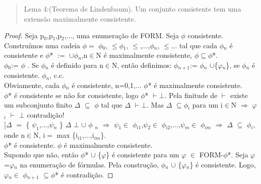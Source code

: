 \documentclass[12pt]{report}
\begin{document}
\begin{quote}
Lema 4:(Teorema de Lindenbaum). Um conjunto consistente tem uma extensão maximalmente consistente.
\end{quote}

\begin{proof}
Seja p$_{0}$,p$_{1}$,p$_{2}$,..., uma enumeração de FORM. Seja $\phi$ consistente. 
Construímos  uma cadeia $\phi$$=$ $\phi$$_{0}$, $\leq$$\phi$$_{1}$, $\leq$,...,$\phi$$_{n}$,
 $\leq$... tal que cada $\phi$$_{n}$ é consistente e $\phi$* $:=$ $\cup$$\phi$$_{n}$,n$\in$N 
 é maximalmente consistente, $\phi$$\subseteq$$\phi$*.\\
$\phi$$_{0}$:= $\phi$ . Se $\phi$$_{n}$ é definido para n$\in$N, então definimos: $\phi$$_{n+1}$:= $\phi$$_{n}$
 $\cup$\{$\varphi$$_{n}$\}, se $\phi$$_{n}$ é consistente. $\phi$$_{n}$, c.c.\\
Obviamente, cada $\phi$$_{n}$ é consistente, n=0,1,... $\phi$* é maximalmente consistente.\\
$\phi$* é consistente se não for consistente, logo $\phi$* $\vdash$$\bot$. Pela finitude de $\vdash$ existe 
um subconjunto finito $\Delta$ $\subseteq$ $\phi$ tal que $\Delta$ $\vdash$$\bot$. Mas $\Delta$ $\subseteq$$\phi$$_{i}$ 
para um i$\in$N $\Longrightarrow$ $\varphi$$_{i}$ $\vdash$ $\bot$ contradição!\\
$[$$\Delta$ $=$ \{ $\psi_{1}$,...,$\psi$$_{n}$ \} $\Delta$ $\bot$ $\cup$ $\phi$ $_{n}$ $\Longrightarrow$ $\psi$$_{1}$$\in$ 
$\phi$$_{i1}$,$\psi$$_{2}$$\in$ $\phi$$_{i2}$,...,$\psi$$_{m}$$\in$ $\phi$$_{im}$ $\Longrightarrow$ $\Delta$ $\subseteq$ 
$\phi$$_{i}$, onde n$\in$N, i$=$ max \{i$_{i1}$,...,i$_{im}$\}.\\
$\phi$* é consistente. $\phi$ é maximalmente consistente.\\
Supondo que não, então $\phi$* $\cup$ \{$\varphi$\} é consistente para um $\varphi$ $\in$ FORM-$\phi$*. 
Seja $\varphi$=$\varphi$$_{n}$ na enumeração de fórmulas. Pela construção, $\phi$$_{n}$ $\cup$ \{$\varphi$$_{n}$\} 
é consistente. Logo, $\varphi$$_{n}$$\in$ $\phi$$_{n+1}$ $\subseteq$$\phi$* é contradição.
\end{proof}
	
\end{document}
